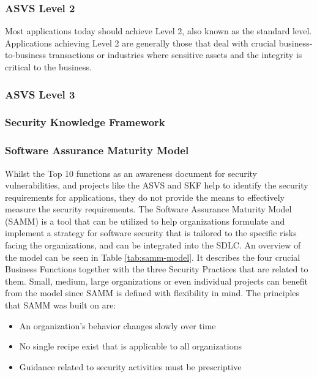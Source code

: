 \subsubsection{ASVS Level 2}
Most applications today should achieve Level 2, also known as the standard level. Applications achieving Level 2 are generally those that deal with crucial business-to-business transactions or industries where sensitive assets and the integrity is critical to the business.

\subsubsection{ASVS Level 3}

\subsubsection{Security Knowledge Framework}

\subsubsection{Software Assurance Maturity Model}
Whilst the Top 10 functions as an awareness document for security vulnerabilities, and projects like the ASVS and SKF help to identify the security requirements for applications, they do not provide the means to effectively measure the security requirements. The Software Assurance Maturity Model (SAMM) is a tool that can be utilized to help organizations formulate and implement a strategy for software security that is tailored to the specific risks facing the organizations, and can be integrated into the SDLC. An overview of the model can be seen in Table \ref{tab:samm-model}. It describes the four crucial Business Functions together with the three Security Practices that are related to them. Small, medium, large organizations or even individual projects can benefit from the model since SAMM is defined with flexibility in mind. The principles that SAMM was built on are:

\begin{itemize}
    \item An organization's behavior changes slowly over time
    \item No single recipe exist that is applicable to all organizations
    \item Guidance related to security activities must be prescriptive
\end{itemize}

